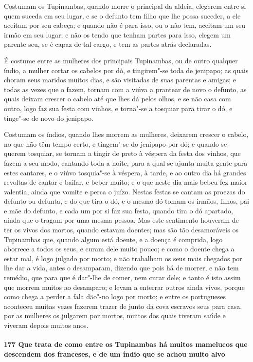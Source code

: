 Costumam os Tupinambas, quando morre o principal da aldeia, elegerem entre si quem suceda
em seu lugar, e se o defunto tem filho que lhe possa suceder, a ele aceitam por seu
cabeça; e quando não é para isso, ou o não tem, aceitam um seu irmão em seu lugar; e não
os tendo que tenham partes para isso, elegem um parente seu, se é capaz de tal cargo, e
tem as partes atrás declaradas.

É costume entre as mulheres dos principais Tupinambas, ou de outro qualquer índio, a
mulher cortar os cabelos por dó, e tingirem"-se toda de jenipapo; as quais choram seus
maridos muitos dias, e são visitadas de suas parentas e amigas; e todas as vezes que o
fazem, tornam com a viúva a prantear de novo o defunto, as quais deixam crescer o cabelo
até que lhes dá pelos olhos, e se não casa com outro, logo faz sua festa com vinhos, e
torna"-se a tosquiar para tirar o dó, e tinge"-se de novo do jenipapo.

Costumam os índios, quando lhes morrem as mulheres, deixarem crescer o cabelo, no que não
têm tempo certo, e tingem"-se do jenipapo por dó; e quando se querem tosquiar, se tornam a
tingir de preto à véspera da festa dos vinhos, que fazem a seu modo, cantando toda a
noite, para a qual se ajunta muita gente para estes cantares, e o viúvo tosquia"-se à
véspera, à tarde, e ao outro dia há grandes revoltas de cantar e bailar, e beber muito; e
o que neste dia mais bebeu fez maior valentia, ainda que vomite e perca o juízo. Nestas
festas se cantam as proezas do defunto ou defunta, e do que tira o dó, e o mesmo dó tomam
os irmãos, filhos, pai e mãe do defunto, e cada um por si faz sua festa, quando tira o dó
apartado, ainda que o tragam por uma mesma pessoa. Mas este sentimento houveram de ter os
vivos dos mortos, quando estavam doentes; mas são tão desamoráveis os Tupinambas que,
quando algum está doente, e a doença é comprida, logo aborrece a todos os seus, e curam
dele muito pouco; e como o doente chega a estar mal, é logo julgado por morto; e não
trabalham os seus mais chegados por lhe dar a vida, antes o desamparam, dizendo que pois
há de morrer, e não tem remédio, que para que é dar"-lhe de comer, nem curar dele; e tanto
é isto assim que morrem muitos ao desamparo; e levam a enterrar outros ainda vivos, porque
como chega a perder a fala dão"-no logo por morto; e entre os portugueses aconteceu muitas
vezes fazerem trazer de junto da cova escravos seus para casa, por as mulheres os julgarem
por mortos, muitos dos quais tiveram saúde e viveram depois muitos anos.

\paragraph{177 Que trata de como entre os Tupinambas há muitos mamelucos que descendem dos
franceses, e de um índio que se achou muito alvo}

